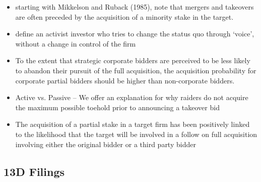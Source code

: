 \documentclass[12pt]{article}
\begin{document}
\begin{itemize}
        \item starting with Mikkelson and Ruback (1985), note that mergers and takeovers are often preceded by the acquisition of a minority stake in the target. \citep{Greenwood2009}

        \item define an activist investor who tries to change the status quo through ‘voice’, without a change in control of the firm \citep{Greenwood2009}

        \item To the extent that strategic corporate bidders are perceived to be less likely to abandon their pursuit of the full acquisition, the acquisition probability for corporate partial bidders should be higher than non-corporate bidders.

        \item Active vs. Passive -- We offer an explanation for why raiders do not acquire the maximum possible toehold prior to announcing a takeover bid \citep{Goldman2005}

        \item The acquisition of a partial stake in a target firm has been positively linked to the likelihood that the target will be involved in a follow on full acquisition involving either the original bidder or a third party bidder \citep{Akhigbe2007}

    \end{itemize}


\subsection{13D Filings}
\end{document}
